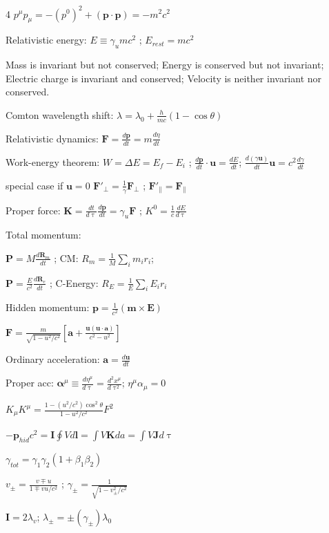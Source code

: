 \documentclass[a4paper,twoside]{article}
\begin{document}
\begin{multicols*}{4}
\(p^\mu p_\mu = -(p^0)^2+ (\bm p \cdot \bm p) = -m^2c^2\)



Relativistic energy:
\(E \equiv \gamma_u mc^2\) ;
\(E_{rest}=mc^2\)

Mass is invariant but not conserved;
Energy is conserved but not invariant;
Electric charge is invariant and conserved;
Velocity is neither invariant nor conserved.


Comton wavelength shift:
\(\lambda = \lambda_0 + \frac{h}{mc}(1-\cos \theta)\)

Relativistic dynamics:
\(\bm F = \frac{d\bm p}{dt} = m \frac{d\eta}{dt}\)

Work-energy theorem:
\(W = \Delta E = E_f - E_i\) ; \(\frac{d\bm p}{dt} \cdot \bm u = \frac{dE}{dt}\);
\(\frac{d(\gamma \bm u)}{dt}\bm u = c^2\frac{d\gamma}{dt}\)

special case if \(\bm u = 0\)
\(\bm F'_{\perp} = \frac{1}{\gamma} \bm F_{\perp}\) ; \(\bm F'_{\parallel} = \bm F_{\parallel}\)

Proper force:
\(\bm K = \frac{dt}{d\uptau} \frac{d\bm p}{dt} = \gamma_u \bm F\) ; \(K^0 = \frac{1}{c} \frac{dE}{d\uptau}\)

Total momentum:

\(\bm P = M \frac{d \bm R_m}{dt}\) ; CM: \(R_m = \frac{1}{M} \sum_i m_i r_i\);

\(\bm P = \frac{E}{c^2} \frac{d\bm R_e}{dt}\) ;  C-Energy: \(R_E = \frac{1}{E} \sum_i E_i r_i\)

Hidden momentum:
\(\bm p = \frac{1}{c^2} (\bm m\times \bm E )\)

\(\bm F = \frac{m}{\sqrt{1-u^2/c^2}}[\bm a + \frac{\bm u (\bm u \cdot \bm a)}{c^2-u^2}]\)

Ordinary acceleration:
\(\bm a = \frac{d\bm u}{dt}\)

Proper acc:
\(\bm \alpha^\mu \equiv \frac{d\eta^\mu}{d \uptau} = \frac{d^2 x^\mu}{d \uptau^2}\);
\(\eta^\mu \alpha_\mu = 0\)

\(K_\mu K^\mu = \frac{1 - (u^2/c^2) \cos^2 \theta}{1 - u^2/c^2} F^2 \)

\(-\bm p_{hid} c^2 = \bm I \oint V d\bm l = \int V \bm K da =  \int V \bm J d\uptau\)


\(\gamma_{tot} = \gamma_1 \gamma_2 (1 + \beta_1 \beta_2)\)

\(v_\pm = \frac{v \mp u}{1 \mp vu/c^2}\) ; \(\gamma_\pm = \frac{1}{\sqrt{1 - v_\pm^2/c^2}}\)

\(\bm I = 2 \lambda_v \); \(\lambda_\pm = \pm (\gamma_\pm) \lambda_0\)



\end{multicols*}
\end{document}
